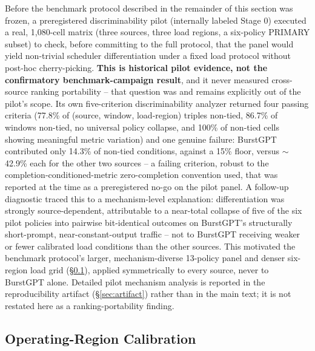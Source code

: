 Before the benchmark protocol described in the remainder of this section
was frozen, a preregistered discriminability pilot (internally labeled
Stage 0) executed a real, 1,080-cell matrix (three sources, three load
regions, a six-policy PRIMARY subset) to check, before committing to the
full protocol, that the panel would yield non-trivial scheduler
differentiation under a fixed load protocol without post-hoc
cherry-picking. \textbf{This is historical pilot evidence, not the
confirmatory benchmark-campaign result}, and it never measured
cross-source ranking portability -- that question was and remains
explicitly out of the pilot's scope. Its own five-criterion
discriminability analyzer returned four passing criteria (77.8\% of
(source, window, load-region) triples non-tied, 86.7\% of windows
non-tied, no universal policy collapse, and 100\% of non-tied cells showing
meaningful metric variation) and one genuine failure: BurstGPT contributed
only 14.3\% of non-tied conditions, against a 15\% floor, versus
$\sim$42.9\% each for the other two sources -- a failing criterion, robust
to the completion-conditioned-metric zero-completion convention used, that
was reported at the time as a preregistered no-go on the pilot panel. A
follow-up diagnostic traced this to a
mechanism-level explanation: differentiation was strongly source-dependent,
attributable to a near-total collapse of five of the six pilot policies
into pairwise bit-identical outcomes on BurstGPT's structurally
short-prompt, near-constant-output traffic -- not to BurstGPT receiving
weaker or fewer calibrated load conditions than the other sources. This
motivated the benchmark protocol's larger, mechanism-diverse 13-policy
panel and denser six-region load grid (\S\ref{sec:calibration}), applied
symmetrically to every source, never to BurstGPT alone. Detailed pilot
mechanism analysis is reported in the reproducibility artifact
(\S\ref{sec:artifact}) rather than in the main text; it is not restated
here as a ranking-portability finding.

\subsection{Operating-Region Calibration}
\label{sec:calibration}

